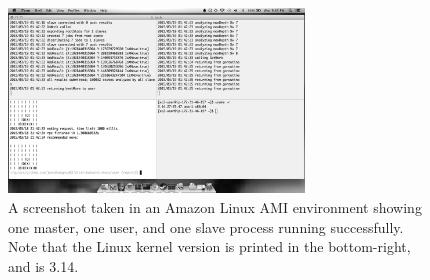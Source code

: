 \documentclass[pdftex,12pt,a4paper]{article}
\begin{document}
\begin{figure}[h]
\begin{center}
\includegraphics[width=0.7\textwidth]{img/linux}
\caption{A screenshot taken in an Amazon Linux AMI environment showing one master, one user, and one slave process running successfully. Note that the Linux kernel version is printed in the bottom-right, and is 3.14.}
\label{fig:linux}
\end{center}
\end{figure}


%
%

\pagebreak
\hspace{4cm}
\pagebreak


\end{document}
